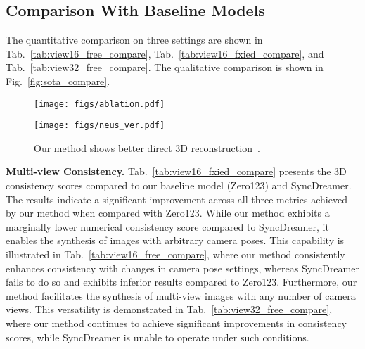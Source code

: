 


\subsection{Comparison With Baseline Models}
The quantitative comparison on three settings are shown in Tab.~\ref{tab:view16_free_compare}, Tab.~\ref{tab:view16_fxied_compare}, and Tab.~\ref{tab:view32_free_compare}. The qualitative comparison is shown in Fig.~\ref{fig:sota_compare}.






\begin{figure*}[ht]
    \centering
    \begin{minipage}{0.65\textwidth}
        \centering
        \texttt{[image: figs/ablation.pdf]}
        \vspace{-2mm}
        \label{fig:ablation}
    \end{minipage}\hfill
    \begin{minipage}{0.33\textwidth}
        \centering
        \texttt{[image: figs/neus\_ver.pdf]}
        \vspace{-3mm}
        \caption{Our method shows better direct 3D reconstruction~\cite{neus}.}
        \label{fig:neus}
    \end{minipage}
    \vspace{-5mm}
\end{figure*}

\noindent\textbf{Multi-view Consistency.}
Tab.~\ref{tab:view16_fxied_compare} presents the 3D consistency scores compared to our baseline model (Zero123) and SyncDreamer. The results indicate a significant improvement across all three metrics achieved by our method when compared with Zero123.
While our method exhibits a marginally lower numerical consistency score compared to SyncDreamer, it enables the synthesis of images with arbitrary camera poses.	
This capability is illustrated in Tab.~\ref{tab:view16_free_compare}, where our method consistently enhances consistency with changes in camera pose settings, whereas SyncDreamer fails to do so and exhibits inferior results compared to Zero123.
Furthermore, our method facilitates the synthesis of multi-view images with any number of camera views. This versatility is demonstrated in Tab.~\ref{tab:view32_free_compare}, where our method continues to achieve significant improvements in consistency scores, while SyncDreamer is unable to operate under such conditions.	

